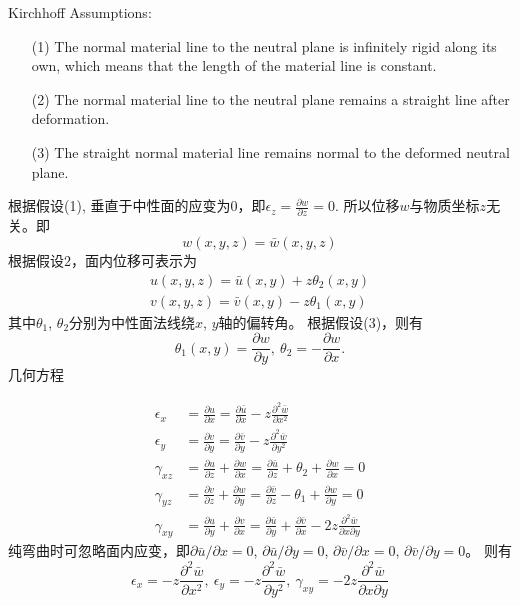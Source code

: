 \noindent Kirchhoff Assumptions:
\begin{enumerate}
    \item[(1)] The normal material line to the neutral plane is infinitely rigid along its own, which means that the length of the material line is constant.
    \item[(2)] The normal material line to the neutral plane remains a straight line after deformation.
    \item[(3)] The straight normal material line remains normal to the deformed neutral plane.
\end{enumerate}
根据假设(1), 垂直于中性面的应变为0，即$\epsilon_{z}=\frac{\partial w}{\partial z}=0$. 
所以位移$w$与物质坐标$z$无关。即
\begin{equation}
    w(x,y,z)=\bar{w}(x,y,z)
\end{equation}
根据假设2，面内位移可表示为
\begin{equation}
    \begin{aligned}
        u(x,y,z)=\bar{u}(x,y)+z\theta_{2}(x,y)\\
        v(x,y,z)=\bar{v}(x,y)-z\theta_{1}(x,y)
    \end{aligned}
\end{equation}
其中$\theta_{1}$, $\theta_{2}$分别为中性面法线绕$x$, $y$轴的偏转角。
根据假设(3)，则有
\begin{equation}
    \theta_{1}(x,y)=\frac{\partial w}{\partial y},\ \theta_{2}=-\frac{\partial w}{\partial x}.
\end{equation}
几何方程

\begin{equation}
    \begin{aligned}
        \epsilon_{x}&=\frac{\partial u}{\partial x}=\frac{\partial \bar{u}}{\partial x}-z\frac{\partial^{2}\bar{w}}{\partial x^{2}}\\
        \epsilon_{y}&=\frac{\partial v}{\partial y}=\frac{\partial \bar{v}}{\partial y}-z\frac{\partial^{2}\bar{w}}{\partial y^{2}}\\
        \gamma_{xz}&=\frac{\partial u}{\partial z}+\frac{\partial w}{\partial x}=\frac{\partial \bar{u}}{\partial z}+\theta_{2}+\frac{\partial w}{\partial x}=0\\
        \gamma_{yz}&=\frac{\partial v}{\partial z}+\frac{\partial w}{\partial y}=\frac{\partial \bar{v}}{\partial z}-\theta_{1}+\frac{\partial w}{\partial y}=0\\
        \gamma_{xy}&=\frac{\partial u}{\partial y}+\frac{\partial v}{\partial x}=\frac{\partial \bar{u}}{\partial y}+\frac{\partial \bar{v}}{\partial x}-2z\frac{\partial^{2}\bar{w}}{\partial x\partial y}
    \end{aligned}
\end{equation}
纯弯曲时可忽略面内应变，即$\partial\bar{u}/\partial x=0$, $\partial\bar{u}/\partial y=0$, 
$\partial\bar{v}/\partial x=0$, $\partial\bar{v}/\partial y=0$。 则有
\begin{equation}\label{eq-1::geometric-equation}
    \epsilon_{x}=-z\frac{\partial^{2}\bar{w}}{\partial x^{2}},\ 
    \epsilon_{y}=-z\frac{\partial^{2}\bar{w}}{\partial y^{2}},\ 
    \gamma_{xy}=-2z\frac{\partial^{2}\bar{w}}{\partial x\partial y}
\end{equation}

